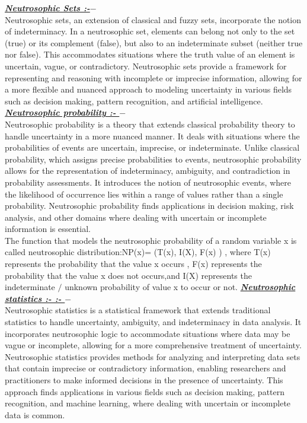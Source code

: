 \documentclass[12pt,a4paper,oneside]{article}
\begin{document}
\textrm{\textit{\textbf{\underline{Neutrosophic  Sets :-$-$}}}}\\
Neutrosophic sets, an extension of classical and fuzzy sets, incorporate the notion of indeterminacy. In a neutrosophic set, elements can belong not only to the set (true) or its complement (false), but also to an indeterminate subset (neither true nor false). This accommodates situations where the truth value of an element is uncertain, vague, or contradictory. Neutrosophic sets provide a framework for representing and reasoning with incomplete or imprecise information, allowing for a more flexible and nuanced approach to modeling uncertainty in various fields such as decision making, pattern recognition, and artificial intelligence.\newline\newline
\textrm{\textit{\textbf{\underline{Neutrosophic probability :- $-$}}}}\\
Neutrosophic probability is a theory that extends classical probability theory to handle uncertainty in a more nuanced manner. It deals with situations where the probabilities of events are uncertain, imprecise, or indeterminate. Unlike classical probability, which assigns precise probabilities to events, neutrosophic probability allows for the representation of indeterminacy, ambiguity, and contradiction in probability assessments. It introduces the notion of neutrosophic events, where the likelihood of occurrence lies within a range of values rather than a single probability. Neutrosophic probability finds applications in decision making, risk analysis, and other domains where dealing with uncertain or incomplete information is essential.\\The function that models the neutrosophic probability of a random variable x is called neutrosophic distribution:NP(x)= (T(x), I(X), F(x) ) , where  T(x) represents the probability that the value x occurs , F(x) represents the probability that the value x does not occurs,and I(X) represents the indeterminate $/$ unknown probability of value x to occur or not.\newline\newline
\textrm{\textit{\textbf{\underline{Neutrosophic statistics :- :- $-$}}}}\\
Neutrosophic statistics is a statistical framework that extends traditional statistics to handle uncertainty, ambiguity, and indeterminacy in data analysis. It incorporates neutrosophic logic to accommodate situations where data may be vague or incomplete, allowing for a more comprehensive treatment of uncertainty. Neutrosophic statistics provides methods for analyzing and interpreting data sets that contain imprecise or contradictory information, enabling researchers and practitioners to make informed decisions in the presence of uncertainty. This approach finds applications in various fields such as decision making, pattern recognition, and machine learning, where dealing with uncertain or incomplete data is common.
\end{document}
